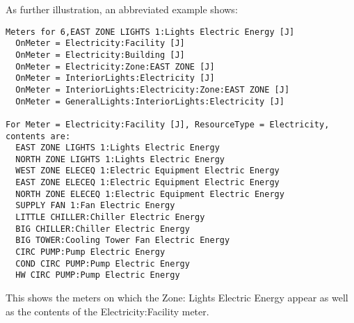As further illustration, an abbreviated example shows:

\begin{lstlisting}
Meters for 6,EAST ZONE LIGHTS 1:Lights Electric Energy [J]
  OnMeter = Electricity:Facility [J]
  OnMeter = Electricity:Building [J]
  OnMeter = Electricity:Zone:EAST ZONE [J]
  OnMeter = InteriorLights:Electricity [J]
  OnMeter = InteriorLights:Electricity:Zone:EAST ZONE [J]
  OnMeter = GeneralLights:InteriorLights:Electricity [J]

For Meter = Electricity:Facility [J], ResourceType = Electricity, contents are:
  EAST ZONE LIGHTS 1:Lights Electric Energy
  NORTH ZONE LIGHTS 1:Lights Electric Energy
  WEST ZONE ELECEQ 1:Electric Equipment Electric Energy
  EAST ZONE ELECEQ 1:Electric Equipment Electric Energy
  NORTH ZONE ELECEQ 1:Electric Equipment Electric Energy
  SUPPLY FAN 1:Fan Electric Energy
  LITTLE CHILLER:Chiller Electric Energy
  BIG CHILLER:Chiller Electric Energy
  BIG TOWER:Cooling Tower Fan Electric Energy
  CIRC PUMP:Pump Electric Energy
  COND CIRC PUMP:Pump Electric Energy
  HW CIRC PUMP:Pump Electric Energy
\end{lstlisting}

This shows the meters on which the Zone: Lights Electric Energy appear as well as the contents of the Electricity:Facility meter.
